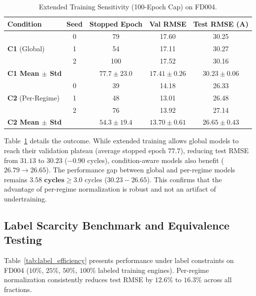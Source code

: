 \documentclass[conference]{IEEEtran}
\begin{document}
\begin{table}[t]
\caption{Extended Training Sensitivity (100-Epoch Cap) on FD004.}
\label{tab:tier1a}
\centering
\begin{tabular}{lcccc}
\toprule
Condition & Seed & Stopped Epoch & Val RMSE & Test RMSE (A) \\
\midrule
\multirow{3}{*}{\textbf{C1} (Global)} & 0 & 79 & 17.60 & 30.25 \\
 & 1 & 54 & 17.11 & 30.27 \\
 & 2 & 100 & 17.52 & 30.16 \\
\cline{2-5}
\multicolumn{2}{l}{\textbf{C1 Mean $\pm$ Std}} & $77.7 \pm 23.0$ & $17.41 \pm 0.26$ & $\mathbf{30.23 \pm 0.06}$ \\
\midrule
\multirow{3}{*}{\textbf{C2} (Per-Regime)} & 0 & 39 & 14.18 & 26.33 \\
 & 1 & 48 & 13.01 & 26.48 \\
 & 2 & 76 & 13.92 & 27.14 \\
\cline{2-5}
\multicolumn{2}{l}{\textbf{C2 Mean $\pm$ Std}} & $54.3 \pm 19.4$ & $13.70 \pm 0.61$ & $\mathbf{26.65 \pm 0.43}$ \\
\bottomrule
\end{tabular}
\end{table}

Table~\ref{tab:tier1a} details the outcome. While extended training allows global models to reach their validation plateau (average stopped epoch $77.7$), reducing test RMSE from $31.13$ to $30.23$ ($-0.90$ cycles), condition-aware models also benefit ($26.79 \to 26.65$). The performance gap between global and per-regime models remains $\mathbf{3.58\text{ cycles}} \ge 3.0$ cycles ($30.23 - 26.65$). This confirms that the advantage of per-regime normalization is robust and not an artifact of undertraining.

\subsection{Label Scarcity Benchmark and Equivalence Testing}
Table~\ref{tab:label_efficiency} presents performance under label constraints on FD004 ($10\%$, $25\%$, $50\%$, $100\%$ labeled training engines). Per-regime normalization consistently reduces test RMSE by $12.6\%$ to $16.3\%$ across all fractions.
\end{document}
